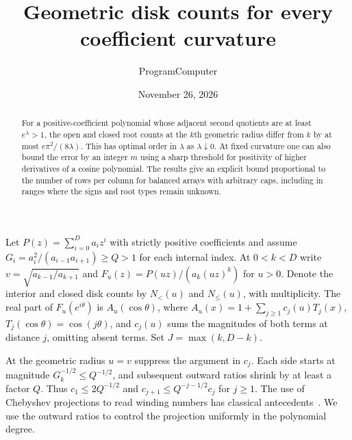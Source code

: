 \documentclass[11pt]{article}
\title{Geometric disk counts for every coefficient curvature}
\author{ProgramComputer}
\date{November 26, 2026}
\begin{document}
\maketitle
\begin{abstract}
For a positive-coefficient polynomial whose adjacent second quotients are at least $e^\lambda>1$, the open and closed root counts at the $k$th geometric radius differ from $k$ by at most $e\pi^2/(8\lambda)$. This has optimal order in $\lambda$ as $\lambda\downarrow0$. At fixed curvature one can also bound the error by an integer $m$ using a sharp threshold for positivity of higher derivatives of a cosine polynomial. The results give an explicit bound proportional to the number of rows per column for balanced arrays with arbitrary caps, including in ranges where the signs and root types remain unknown.
\end{abstract}

Let $P(z)=\sum_{i=0}^D a_i z^i$ with strictly positive coefficients and assume $G_i=a_i^2/(a_{i-1}a_{i+1})\ge Q>1$ for each internal index. At $0<k<D$ write $v=\sqrt{a_{k-1}/a_{k+1}}$ and $F_u(z)=P(uz)/(a_k(uz)^k)$ for $u>0$. Denote the interior and closed disk counts by $N_{<}(u)$ and $N_{\le}(u)$, with multiplicity. The real part of $F_u(e^{i\theta})$ is $A_u(\cos\theta)$, where $A_u(x)=1+\sum_{j\ge1}c_j(u)T_j(x)$, $T_j(\cos\theta)=\cos(j\theta)$, and $c_j(u)$ sums the magnitudes of both terms at distance $j$, omitting absent terms. Set $J=\max(k,D-k)$.

At the geometric radius $u=v$ suppress the argument in $c_j$. Each side starts at magnitude $G_k^{-1/2}\le Q^{-1/2}$, and subsequent outward ratios shrink by at least a factor $Q$. Thus $c_1\le2Q^{-1/2}$ and $c_{j+1}\le Q^{-j-1/2}c_j$ for $j\ge1$. The use of Chebyshev projections to read winding numbers has classical antecedents~\cite{schelin,iserles}. We use the outward ratios to control the projection uniformly in the polynomial degree.
\end{document}
